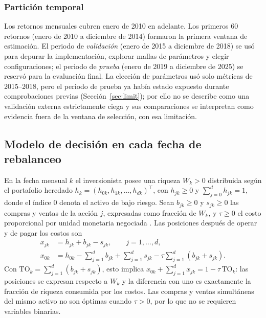 \subsubsection{Partición temporal}

Los retornos mensuales cubren enero de 2010 en adelante. Los primeros 60 retornos (enero de 2010 a diciembre de 2014) formaron la primera ventana de estimación. El periodo de \emph{validación} (enero de 2015 a diciembre de 2018) se usó para depurar la implementación, explorar mallas de parámetros y elegir configuraciones; el periodo de \emph{prueba} (enero de 2019 a diciembre de 2025) se reservó para la evaluación final. La elección de parámetros usó solo métricas de 2015--2018, pero el periodo de prueba ya había estado expuesto durante comprobaciones previas (Sección~\ref{sec:limit}); por ello no se describe como una validación externa estrictamente ciega y sus comparaciones se interpretan como evidencia fuera de la ventana de selección, con esa limitación.

\subsection{Modelo de decisión en cada fecha de rebalanceo}\label{sec:decision}

En la fecha mensual $k$ el inversionista posee una riqueza $W_k>0$ distribuida según el portafolio heredado $h_k=(h_{0k},h_{1k},\dots,h_{dk})^\top$, con $h_{jk}\ge 0$ y $\sum_{j=0}^d h_{jk}=1$, donde el índice $0$ denota el activo de bajo riesgo. Sean $b_{jk}\ge0$ y $s_{jk}\ge0$ las compras y ventas de la acción $j$, expresadas como fracción de $W_k$, y $\tau\ge0$ el costo proporcional por unidad monetaria negociada \citep{hsiehyu2024}. Las posiciones después de operar y de pagar los costos son
\begin{align}
x_{jk}&=h_{jk}+b_{jk}-s_{jk}, \qquad j=1,\dots,d, \label{eq:bal_j}\\
x_{0k}&=h_{0k}-\sum_{j=1}^{d}b_{jk}+\sum_{j=1}^{d}s_{jk}-\tau\sum_{j=1}^{d}(b_{jk}+s_{jk}). \label{eq:bal_0}
\end{align}
Con $\mathrm{TO}_k=\sum_{j=1}^d(b_{jk}+s_{jk})$, esto implica $x_{0k}+\sum_{j=1}^d x_{jk}=1-\tau\,\mathrm{TO}_k$: las posiciones se expresan respecto a $W_k$ y la diferencia con uno es exactamente la fracción de riqueza consumida por los costos. Las compras y ventas simultáneas del mismo activo no son óptimas cuando $\tau>0$, por lo que no se requieren variables binarias.

